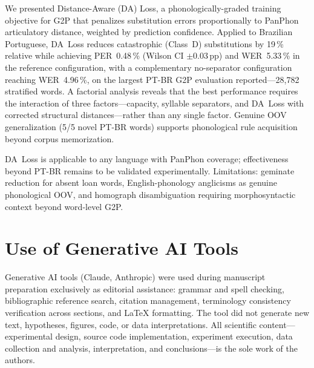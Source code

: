 \documentclass[conference]{IEEEtran}
\begin{document}
We presented Distance-Aware (DA) Loss, a phonologically-graded
training objective for G2P that penalizes substitution errors
proportionally to PanPhon articulatory distance, weighted by
prediction confidence.
Applied to Brazilian Portuguese, DA~Loss reduces catastrophic
(Class~D) substitutions by 19\,\% relative while achieving
PER~0.48\,\% (Wilson CI $\pm$0.03\,pp) and WER~5.33\,\% in the
reference configuration, with a complementary no-separator
configuration reaching WER~4.96\,\%, on the largest PT-BR G2P
evaluation reported---28{,}782 stratified words.
A factorial analysis reveals that the best performance requires
the interaction of three factors---capacity, syllable separators,
and DA~Loss with corrected structural distances---rather than any
single factor.
Genuine OOV generalization (5/5 novel PT-BR words) supports
phonological rule acquisition beyond corpus memorization.

DA~Loss is applicable to any language with PanPhon coverage;
effectiveness beyond PT-BR remains to be validated experimentally.
Limitations: geminate reduction for absent loan words,
English-phonology anglicisms as genuine phonological OOV, and
homograph disambiguation requiring morphosyntactic context beyond
word-level G2P.


\section*{Use of Generative AI Tools}

Generative AI tools (Claude, Anthropic) were used during manuscript
preparation exclusively as editorial assistance: grammar and spell
checking, bibliographic reference search, citation management,
terminology consistency verification across sections, and \LaTeX{}
formatting.
The tool did not generate new text, hypotheses, figures, code, or
data interpretations.
All scientific content---experimental design, source code
implementation, experiment execution, data collection and analysis,
interpretation, and conclusions---is the sole work of the authors.



\end{document}
